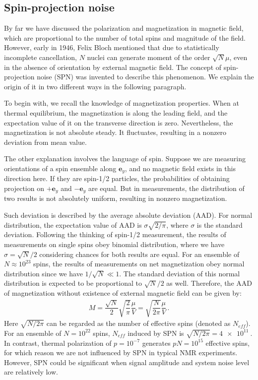 \subsection{Spin-projection noise}\label{sec:NMR:SPN}

By far we have discussed the polarization and magnetization in magnetic field, which are proportional to the number of total spins and magnitude of the field. However, early in 1946, Felix Bloch mentioned that due to statistically incomplete cancellation, $N$ nuclei can generate moment of the order $\sqrt{N}\mu$, even in the absence of orientation by external magnetic field\cite{Bloch_NuclearInduction_PhysRev.70.460}. The concept of spin-projection noise (SPN) was invented to describe this phenomenon. We explain the origin of it in two different ways in the following paragraph. 

To begin with, we recall the knowledge of magnetization properties. When at thermal equilibrium, the magnetization is along the leading field, and the expectation value of it on the transverse direction is zero. Nevertheless, the magnetization is not absolute steady. It fluctuates, resulting in a nonzero deviation from mean value. 

The other explanation involves the language of spin. Suppose we are measuring orientations of a spin ensemble along $\mathbf{e}_y$, and no magnetic field exists in this direction here. If they are spin-1/2 particles, the probabilities of obtaining projection on $+\mathbf{e}_y$ and $-\mathbf{e}_y$ are equal. But in measurements, the distribution of two results is not absolutely uniform, resulting in nonzero magnetization. 

Such deviation is described by the average absolute deviation (AAD). For normal distribution, the expectation value of AAD is $\sigma \sqrt{2/\pi}$, where $\sigma$ is the standard deviation. 
Following the thinking of spin-1/2 measurement, the results of measurements on single spins obey binomial distribution, where we have $\sigma = \sqrt{N}/2$ considering chances for both results are equal. For an ensemble of $N \approx 10^{23}$ spins, the results of measurements on net magnetization obey normal distribution since we have $1/\sqrt{N} \ll 1$. The standard deviation of this normal distribution is expected to be proportional to $\sqrt{N}/2$ as well. Therefore, the AAD of magnetization without existence of external magnetic field can be given by:
\begin{align}
    M = \dfrac{\sqrt{N}}{2} \sqrt{\dfrac{2}{\pi}} \dfrac{\mu}{V} = \sqrt{\dfrac{N}{2 \pi}} \dfrac{\mu}{V}\,.\label{eq:SPN_M}
\end{align}
Here $\sqrt{N/2 \pi}$ can be regarded as the number of effective spins (denoted as $N_{eff}$). For an ensemble of $N = 10^{22}$ spins, $N_{eff}$ induced by SPN is $\sqrt{N/2 \pi}=\SI{4e11}{}$. In contrast, thermal polarization of $p=10^{-7}$ generates $p N = 10^{15}$ effective spins, for which reason we are not influenced by SPN in typical NMR experiments. However, SPN could be significant when signal amplitude and system noise level are relatively low. 

